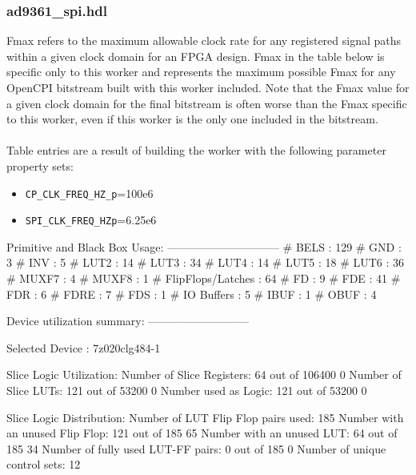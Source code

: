 \documentclass{article}
\def\comp{ad9361\_spi}
\begin{document}
\subsubsection*{\comp.hdl}
Fmax refers to the maximum allowable clock rate for any registered signal paths within a given clock domain for an FPGA design. Fmax in the table below is specific only to this worker and represents the maximum possible Fmax for any OpenCPI bitstream built with this worker included. Note that the Fmax value for a given clock domain for the final bitstream is often worse than the Fmax specific to this worker, even if this worker is the only one included in the bitstream. \\ \\
Table entries are a result of building the worker with the following parameter property sets:
\begin{itemize}
	\item \verb+CP_CLK_FREQ_HZ_p+=100e6
	\item \verb+SPI_CLK_FREQ_HZp+=6.25e6
\end{itemize}
\iffalse
Primitive and Black Box Usage:
------------------------------
# BELS                             : 129
#      GND                         : 3
#      INV                         : 5
#      LUT2                        : 14
#      LUT3                        : 34
#      LUT4                        : 14
#      LUT5                        : 18
#      LUT6                        : 36
#      MUXF7                       : 4
#      MUXF8                       : 1
# FlipFlops/Latches                : 64
#      FD                          : 9
#      FDE                         : 41
#      FDR                         : 6
#      FDRE                        : 7
#      FDS                         : 1
# IO Buffers                       : 5
#      IBUF                        : 1
#      OBUF                        : 4

Device utilization summary:
---------------------------

Selected Device : 7z020clg484-1 


Slice Logic Utilization: 
 Number of Slice Registers:              64  out of  106400     0%
 Number of Slice LUTs:                  121  out of  53200     0%
    Number used as Logic:               121  out of  53200     0%

Slice Logic Distribution: 
 Number of LUT Flip Flop pairs used:    185
   Number with an unused Flip Flop:     121  out of    185    65%
   Number with an unused LUT:            64  out of    185    34%
   Number of fully used LUT-FF pairs:     0  out of    185     0%
   Number of unique control sets:        12
\end{document}
